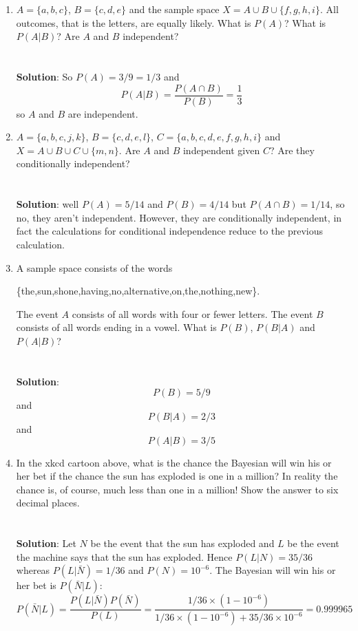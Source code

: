 \documentclass[11pt,a4paper]{scrartcl}
\begin{document}
\begin{enumerate}
\item $A=\{a,b,c\}$, $B=\{c,d,e\}$ and the sample space $X=A\cup B\cup \{f,g,h,i\}$. All outcomes, that is the letters, are equally likely. What is $P(A)$? What is $P(A|B)$? Are $A$ and $B$ independent?\\ \\ \\
  \textbf{Solution}: So $P(A)=3/9=1/3$ and
  \begin{equation}
    P(A|B)=\frac{P(A\cap B)}{P(B)}=\frac{1}{3}
  \end{equation}
  so $A$ and $B$ are independent.

\item $A=\{a,b,c,j,k\}$, $B=\{c,d,e,l\}$, $C=\{a,b,c,d,e,f,g,h,i\}$ and
  $X=A\cup B\cup C\cup \{m,n\}$. Are $A$ and $B$ independent given $C$? Are they
  conditionally independent?\\ \\ \\ \textbf{Solution}: well
  $P(A)=5/14$ and $P(B)=4/14$ but $P(A\cap B)=1/14$, so no, they
  aren't independent. However, they are conditionally independent, in
  fact the calculations for conditional independence reduce to the
  previous calculation.


  
\item A sample space consists of the words
\begin{center}
  \{the,sun,shone,having,no,alternative,on,the,nothing,new\}.
  \end{center}
The event $A$ consists of all words with four or fewer letters. The event $B$ consists of all words ending in a vowel. What is $P(B)$, $P(B|A)$ and $P(A|B)$?\\ \\ \\
\textbf{Solution}:
$$P(B)=5/9$$ 
and
$$P(B|A)=2/3$$
and
$$P(A|B)=3/5$$

\item In the xkcd cartoon above, what is the chance the Bayesian will
  win his or her bet if the chance the sun has exploded is one in a
  million? In reality the chance is, of course, much less than one in
  a million! Show the answer to six decimal places.\\ \\ \\ \textbf{Solution}: Let $N$ be the event that the sun has exploded
  and $L$ be the event the machine says that the sun has
  exploded. Hence $P(L|N)=35/36$ whereas $P(L|\bar{N})=1/36$ and $P(N)=10^{-6}$. The Bayesian will
  win his or her bet is $P(\bar{N}|L)$:
\begin{equation}
P(\bar{N}|L)=\frac{P(L|\bar{N})P(\bar{N})}{P(L)}=\frac{1/36\times (1-10^{-6})}{1/36\times (1-10^{-6})+35/36\times 10^{-6}}=0.999965
\end{equation}


  
\end{enumerate}
  
\end{document}
